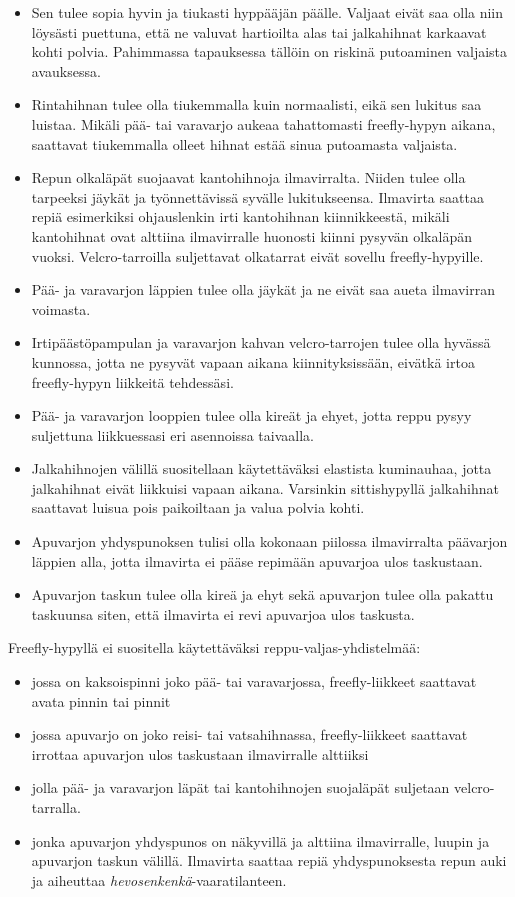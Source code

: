 \begin{itemize}
\item  Sen tulee sopia hyvin ja tiukasti hyppääjän päälle. Valjaat eivät saa olla niin löysästi puettuna, että ne valuvat hartioilta alas tai jalkahihnat karkaavat kohti polvia. Pahimmassa tapauksessa tällöin on riskinä putoaminen valjaista avauksessa. 
\item  Rintahihnan tulee olla tiukemmalla kuin normaalisti, eikä sen lukitus saa luistaa. Mikäli pää- tai varavarjo aukeaa tahattomasti freefly-hypyn aikana, saattavat tiukemmalla olleet hihnat estää sinua putoamasta valjaista.  
\item  Repun olkaläpät suojaavat kantohihnoja ilmavirralta. Niiden tulee olla tarpeeksi jäykät ja työnnettävissä syvälle lukitukseensa. Ilmavirta saattaa repiä esimerkiksi ohjauslenkin irti kantohihnan kiinnikkeestä, mikäli kantohihnat ovat alttiina ilmavirralle huonosti kiinni pysyvän olkaläpän vuoksi. Velcro-tarroilla suljettavat olkatarrat eivät sovellu freefly-hypyille. 
\item  Pää- ja varavarjon läppien tulee olla jäykät ja ne eivät saa aueta ilmavirran voimasta. 
\item  Irtipäästöpampulan ja varavarjon kahvan velcro-tarrojen tulee olla hyvässä kunnossa, jotta ne pysyvät vapaan aikana kiinnityksissään, eivätkä irtoa freefly-hypyn liikkeitä tehdessäsi. 
\item  Pää- ja varavarjon looppien tulee olla kireät ja ehyet, jotta reppu pysyy suljettuna liikkuessasi eri asennoissa taivaalla. 
\item  Jalkahihnojen välillä suositellaan käytettäväksi elastista kuminauhaa, jotta jalkahihnat eivät liikkuisi vapaan aikana. Varsinkin sittishypyllä jalkahihnat saattavat luisua pois paikoiltaan ja valua polvia kohti. 
\item  Apuvarjon yhdyspunoksen tulisi olla kokonaan piilossa ilmavirralta päävarjon läppien alla, jotta ilmavirta ei pääse repimään apuvarjoa ulos taskustaan. 
\item  Apuvarjon taskun tulee olla kireä ja ehyt sekä apuvarjon tulee olla pakattu taskuunsa siten, että ilmavirta ei revi apuvarjoa ulos taskusta. 
\end{itemize}

Freefly-hypyllä ei suositella käytettäväksi reppu-valjas-yhdistelmää: 

\begin{itemize}
\item  jossa on kaksoispinni joko pää- tai varavarjossa, freefly-liikkeet saattavat avata pinnin tai pinnit 
\item  jossa apuvarjo on joko reisi- tai vatsahihnassa, freefly-liikkeet saattavat irrottaa apuvarjon ulos taskustaan ilmavirralle alttiiksi  
\item  jolla pää- ja varavarjon läpät tai kantohihnojen suojaläpät suljetaan velcro-tarralla. 
\item  jonka apuvarjon yhdyspunos on näkyvillä ja alttiina ilmavirralle, luupin ja apuvarjon taskun välillä. Ilmavirta saattaa repiä yhdyspunoksesta repun auki ja aiheuttaa \textit{hevosenkenkä}-vaaratilanteen. 
\end{itemize}

